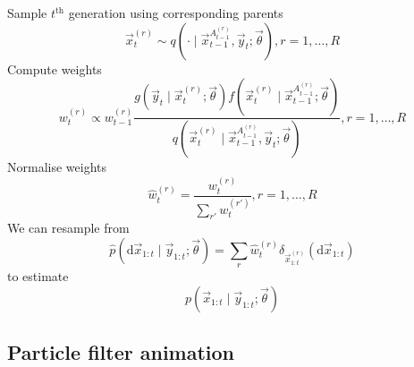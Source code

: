 \begin{algorithmbis}
\begin{algorithmic}[1]
                \State Sample $t^{\text{th}}$ generation using corresponding parents
                    \begin{equation}
                        \vec x_t^{(r)} \sim q\left(\cdot \mid \vec x_{t - 1}^{A_{t - 1}^{(r)}}, \vec y_t; \vec \theta\right), r = 1, \dotsc, R
                    \end{equation}
                \State Compute weights
                    \begin{equation}
                        w_t^{(r)} \propto w_{t - 1}^{(r)} \frac{g\left(\vec y_t \mid \vec x_t^{(r)}; \vec \theta\right) f\left(\vec x_t^{(r)} \mid \vec x_{t - 1}^{A_{t - 1}^{(r)}}; \vec \theta \right)}{q\left(\vec x_t^{(r)} \mid \vec x_{t - 1}^{A_{t - 1}^{(r)}}, \vec y_t; \vec \theta \right)}, r = 1, \dotsc, R
                    \end{equation}
                \State Normalise weights
                    \begin{equation}
                        \hat w_t^{(r)} = \frac{w_t^{(r)}}{\sum_{r'} w_t^{(r')}}, r = 1, \dotsc, R
                    \end{equation}
                \State We can resample from
                    \begin{equation}
                        \hat p(\mathrm d \vec x_{1:t} \mid \vec y_{1:t}; \vec \theta) = \sum_r \hat w_t^{(r)} \delta_{\vec x_{1:t}^{(r)}}(\mathrm d \vec x_{1:t})
                    \end{equation}
                    to estimate
                    \begin{equation}
                        p(\vec x_{1:t} \mid \vec y_{1:t}; \vec \theta)
                    \end{equation}
            \EndFor
        \end{algorithmic}
    \end{algorithmbis}

\subsection{Particle filter animation}

